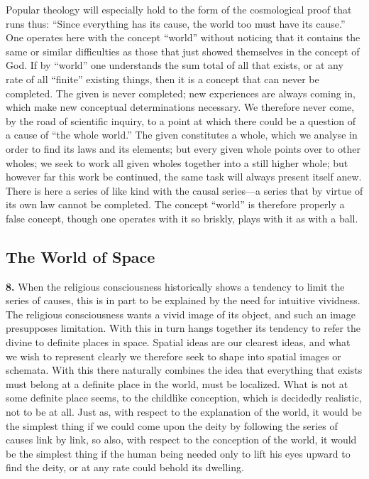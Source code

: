 \documentclass[12pt,a4paper]{book}
\newcommand{\opage}[1]{\marginnote{\footnotesize\textit{[#1]}}}
\begin{document}
Popular theology will especially hold to the form of the cosmological
proof that runs thus: ``Since everything has its cause, the world too
must have its cause.'' One operates here with the concept ``world''
without noticing that it contains the same or similar difficulties as
those that just showed themselves in the concept of God. If by ``world''
one understands the sum total of all that exists, or at any rate of all
``finite'' existing things, then it is a concept that can never be
completed. The given is never completed; new experiences are always
coming in, which make new conceptual determinations necessary. We
therefore never come, by the road of scientific inquiry, to a point at
which there could be a question of a cause of ``the whole world.'' The
given constitutes a whole, which we analyse in order to find its laws
and its elements; but every given whole points over to other wholes; we
seek to work all given wholes together into a still higher whole; but
however far this work be continued, the same task will always present
itself anew. There is here a series of like kind with the causal
series---a series that by virtue of its own law cannot be completed. The
concept ``world'' is therefore properly a false concept, though one
operates with it so briskly, plays with it as with a ball.

\subsection{The World of Space}
\label{ssec:space}

\noindent\textbf{8.} When the religious consciousness historically shows a
tendency to limit the series of causes, this is in part to be explained by
the 
\opage{24}need for intuitive vividness. The religious consciousness wants a vivid
image of its object, and such an image presupposes limitation. With this in
turn hangs together its tendency to refer the divine to definite places in
space. Spatial ideas are our clearest ideas, and what we wish to represent
clearly we therefore seek to shape into spatial images or schemata. With
this there naturally combines the idea that everything that exists must
belong at a definite place in the world, must be localized. What is not at
some definite place seems, to the childlike conception, which is decidedly
realistic, not to be at all. Just as, with respect to the explanation of the
world, it would be the simplest thing if we could come upon the deity by
following the series of causes link by link, so also, with respect to the
conception of the world, it would be the simplest thing if the human being
needed only to lift his eyes upward to find the deity, or at any rate could
behold its dwelling.
\end{document}
